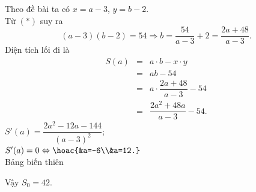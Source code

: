 \begin{ex}
{		Theo đề bài ta có $x=a-3$, $y=b-2$.\\
		Từ $(*)$ suy ra $$(a-3)(b-2)=54\Rightarrow b=\dfrac{54}{a-3}+2=\dfrac{2a+48}{a-3}.$$
		Diện tích lối đi là \begin{eqnarray*}
			S(a)&=&a\cdot b-x\cdot y\\
			&=&ab-54\\
			&=&a\cdot \dfrac{2a+48}{a-3}-54\\
			&=&\dfrac{2a^2+48a}{a-3}-54.
		\end{eqnarray*}
		$S'(a)=\dfrac{2a^2-12a-144}{\left(a-3\right)^2}$;\\
		$S'(a)=0\Leftrightarrow \hoac{&a=-6\\&a=12.}$\\
		Bảng biến thiên
		\begin{center}
		\end{center}
		Vậy $S_0=42$.
	}
\end{ex}

